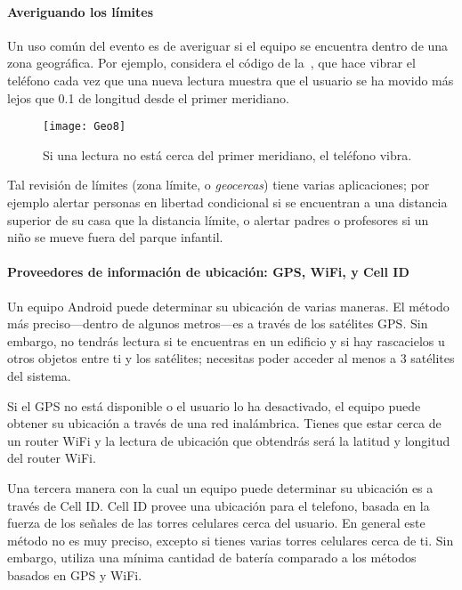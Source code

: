 \paragraph{Averiguando los límites}

Un uso común del evento  es de averiguar si
el equipo se encuentra dentro de una zona geográfica. Por ejemplo,
considera el código de la~, que hace vibrar el teléfono
cada vez que una nueva lectura muestra que el usuario se ha movido más
lejos que 0.1 de longitud desde el primer meridiano.

\begin{figure}[H]
  \centering
  \texttt{[image: Geo8]}
  \caption{Si una lectura no está cerca del primer meridiano, el
    teléfono vibra.}
  \label{fig:Geo8}
\end{figure}

Tal revisión de límites (zona límite, o \emph{geocercas}) tiene varias aplicaciones; por
ejemplo alertar personas en libertad condicional si se encuentran a una
distancia superior de su casa que la distancia límite, o alertar padres
o profesores si un niño se mueve fuera del parque infantil.

\paragraph{Proveedores de información de ubicación: GPS, WiFi, y Cell ID}

Un equipo Android puede determinar su ubicación de varias maneras. El
método más preciso---dentro de algunos metros---es a través de los
satélites GPS. Sin embargo, no tendrás lectura si te encuentras en un
edificio y si hay rascacielos u otros objetos entre ti y los
satélites; necesitas poder acceder al menos a 3 satélites del sistema.

Si el GPS no está disponible o el usuario lo ha desactivado, el equipo
puede obtener su ubicación a través de una red inalámbrica.  Tienes
que estar cerca de un router WiFi y la lectura de ubicación que
obtendrás será la latitud y longitud del router WiFi.

Una tercera manera con la cual un equipo puede determinar su ubicación
es a través de Cell ID. Cell ID provee una ubicación para el telefono,
basada en la fuerza de los señales de las torres celulares cerca del
usuario. En general este método no es muy preciso, excepto si tienes
varias torres celulares cerca de ti. Sin embargo, utiliza una mínima
cantidad de batería comparado a los métodos basados en GPS y WiFi.

